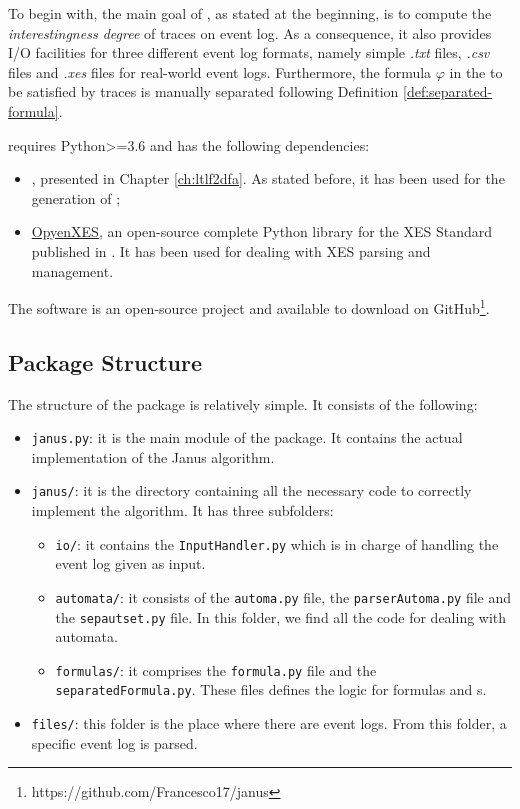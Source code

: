 To begin with, the main goal of \janus, as stated at the beginning, is to compute the \textit{interestingness degree} of traces on event log.  As a consequence, it also provides I/O facilities for three different event log formats, namely simple \textit{.txt} files, \textit{.csv} files and \textit{.xes} files for real-world event logs. Furthermore, the formula $\varphi$ in the \rcon\xspace to be satisfied by traces is manually separated following Definition \ref{def:separated-formula}.

\janus requires Python>=3.6 and has the following dependencies:
\begin{itemize}
\item \LTLfToDFA, presented in Chapter \ref{ch:ltlf2dfa}. As stated before, it has been used for the generation of \DFAs;
\item \href{https://github.com/opyenxes/OpyenXes}{OpyenXES}, an open-source complete Python library for the XES Standard published in \citep{DBLP:conf/bpm/ValdiviesoLMS18}. It has been used for dealing with XES parsing and management.
\end{itemize} 
The \janus software is an open-source project and available to download on GitHub\footnote{https://github.com/Francesco17/janus}.
\subsection{Package Structure}
The structure of the \janus package is relatively simple. It consists of the following:
\begin{itemize}
\item \texttt{janus.py}: it is the main module of the package. It contains the actual implementation of the Janus algorithm.
\item \texttt{janus/}: it is the directory containing all the necessary code to correctly implement the algorithm. It has three subfolders:
\begin{itemize}
\item  \texttt{io/}: it contains the \texttt{InputHandler.py} which is in charge of handling the event log given as input.
\item \texttt{automata/}: it consists of the \texttt{automa.py} file, the \texttt{parserAutoma.py} file and the \texttt{sepautset.py} file. In this folder, we find all the code for dealing with automata.
\item \texttt{formulas/}: it comprises the \texttt{formula.py} file and the \texttt{separatedFormula.py}. These files defines the logic for \LTLp formulas and \rcon s.
\end{itemize}
\item \texttt{files/}: this folder is the place where there are event logs. From this folder, a specific event log is parsed.
\end{itemize}
